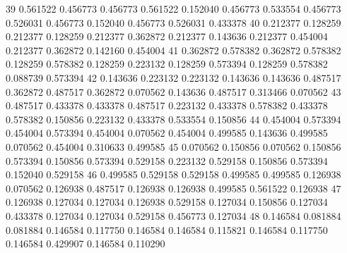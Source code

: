 {   39    0.561522     0.456773    0.456773    0.561522              0.152040             0.456773           0.533554             0.456773                0.526031                0.456773               0.152040              0.456773               0.526031                0.433378
   40    0.212377     0.128259    0.212377    0.128259              0.212377             0.362872           0.212377             0.143636                0.212377                0.454004               0.212377              0.362872               0.142160                0.454004
   41    0.362872     0.578382    0.362872    0.578382              0.128259             0.578382           0.128259             0.223132                0.128259                0.573394               0.128259              0.578382               0.088739                0.573394
   42    0.143636     0.223132    0.223132    0.143636              0.143636             0.487517           0.362872             0.487517                0.362872                0.070562               0.143636              0.487517               0.313466                0.070562
   43    0.487517     0.433378    0.433378    0.487517              0.223132             0.433378           0.578382             0.433378                0.578382                0.150856               0.223132              0.433378               0.533554                0.150856
   44    0.454004     0.573394    0.454004    0.573394              0.454004             0.070562           0.454004             0.499585                0.143636                0.499585               0.070562              0.454004               0.310633                0.499585
   45    0.070562     0.150856    0.070562    0.150856              0.573394             0.150856           0.573394             0.529158                0.223132                0.529158               0.150856              0.573394               0.152040                0.529158
   46    0.499585     0.529158    0.529158    0.499585              0.499585             0.126938           0.070562             0.126938                0.487517                0.126938               0.126938              0.499585               0.561522                0.126938
   47    0.126938     0.127034    0.127034    0.126938              0.529158             0.127034           0.150856             0.127034                0.433378                0.127034               0.127034              0.529158               0.456773                0.127034
   48    0.146584     0.081884    0.081884    0.146584              0.117750             0.146584           0.146584             0.115821                0.146584                0.117750               0.146584              0.429907               0.146584                0.110290
}
